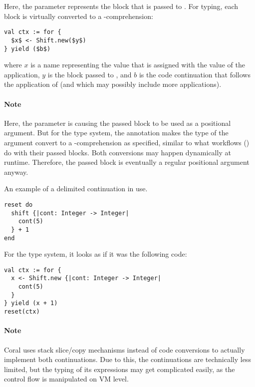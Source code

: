 Here, the  parameter represents the block that is passed to . For typing, each  block is virtually converted to a -comprehension:
\begin{lstlisting}
val ctx := for {
  $x$ <- Shift.new($y$)
} yield ($b$)
\end{lstlisting}
where $x$ is a name representing the value that is assigned with the value of the  application, $y$ is the block passed to , and $b$ is the code continuation that follows the application of  (and which may possibly include more  applications). 

\paragraph{Note}
Here, the  parameter is causing the passed block to be used as a positional argument. But for the type system, the annotation  makes the type of the argument convert to a -comprehension as specified, similar to what workflows () do with their passed blocks. Both conversions may happen dynamically at runtime. Therefore, the passed block is eventually a regular positional argument anyway. 

\example An example of a delimited continuation in use. 
\begin{lstlisting}
reset do
  shift {|cont: Integer -> Integer|
    cont(5)
  } + 1
end
\end{lstlisting}
For the type system, it looks as if it was the following code:
\begin{lstlisting}
val ctx := for {
  x <- Shift.new {|cont: Integer -> Integer|
    cont(5)
  }
} yield (x + 1)
reset(ctx)
\end{lstlisting}

\paragraph{Note}
Coral uses stack slice/copy mechanisms instead of code conversions to actually implement both continuations. Due to this, the continuations are technically less limited, but the typing of its expressions may get complicated easily, as the control flow is manipulated on VM level.






